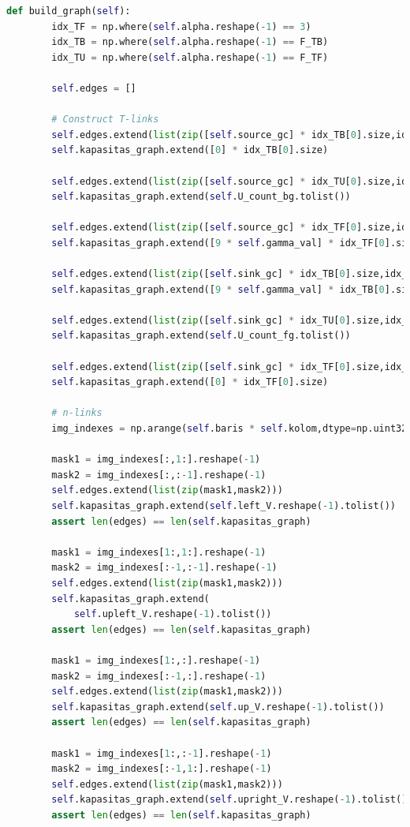 \begin{lstlisting}[language=Python,basicstyle=\tiny]
	def build_graph(self):
		idx_TF = np.where(self.alpha.reshape(-1) == 3)
		idx_TB = np.where(self.alpha.reshape(-1) == F_TB)
		idx_TU = np.where(self.alpha.reshape(-1) == F_TF)

		self.edges = []

		# Construct T-links
		self.edges.extend(list(zip([self.source_gc] * idx_TB[0].size,idx_TB[0])))
		self.kapasitas_graph.extend([0] * idx_TB[0].size)

		self.edges.extend(list(zip([self.source_gc] * idx_TU[0].size,idx_TU[0])))
		self.kapasitas_graph.extend(self.U_count_bg.tolist())
	
		self.edges.extend(list(zip([self.source_gc] * idx_TF[0].size,idx_TF[0])))
		self.kapasitas_graph.extend([9 * self.gamma_val] * idx_TF[0].size)

		self.edges.extend(list(zip([self.sink_gc] * idx_TB[0].size,idx_TB[0])))
		self.kapasitas_graph.extend([9 * self.gamma_val] * idx_TB[0].size)
		
		self.edges.extend(list(zip([self.sink_gc] * idx_TU[0].size,idx_TU[0])))
		self.kapasitas_graph.extend(self.U_count_fg.tolist())

		self.edges.extend(list(zip([self.sink_gc] * idx_TF[0].size,idx_TF[0])))
		self.kapasitas_graph.extend([0] * idx_TF[0].size)

		# n-links
		img_indexes = np.arange(self.baris * self.kolom,dtype=np.uint32).reshape(self.baris,self.kolom)

		mask1 = img_indexes[:,1:].reshape(-1)
		mask2 = img_indexes[:,:-1].reshape(-1)
		self.edges.extend(list(zip(mask1,mask2)))
		self.kapasitas_graph.extend(self.left_V.reshape(-1).tolist())
		assert len(edges) == len(self.kapasitas_graph)

		mask1 = img_indexes[1:,1:].reshape(-1)
		mask2 = img_indexes[:-1,:-1].reshape(-1)
		self.edges.extend(list(zip(mask1,mask2)))
		self.kapasitas_graph.extend(
			self.upleft_V.reshape(-1).tolist())
		assert len(edges) == len(self.kapasitas_graph)

		mask1 = img_indexes[1:,:].reshape(-1)
		mask2 = img_indexes[:-1,:].reshape(-1)
		self.edges.extend(list(zip(mask1,mask2)))
		self.kapasitas_graph.extend(self.up_V.reshape(-1).tolist())
		assert len(edges) == len(self.kapasitas_graph)

		mask1 = img_indexes[1:,:-1].reshape(-1)
		mask2 = img_indexes[:-1,1:].reshape(-1)
		self.edges.extend(list(zip(mask1,mask2)))
		self.kapasitas_graph.extend(self.upright_V.reshape(-1).tolist())
		assert len(edges) == len(self.kapasitas_graph)


\end{lstlisting}
